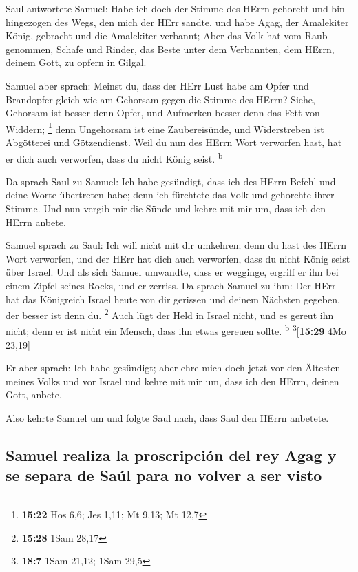  Saul antwortete Samuel: Habe ich doch der Stimme des
HErrn gehorcht und bin hingezogen des Wegs, den mich der HErr sandte,
und habe Agag, der Amalekiter König, gebracht und die Amalekiter
verbannt;  Aber das Volk hat vom Raub genommen, Schafe
und Rinder, das Beste unter dem Verbannten, dem HErrn, deinem Gott, zu
opfern in Gilgal.

 Samuel aber sprach: Meinst du, dass der HErr Lust habe
am Opfer und Brandopfer gleich wie am Gehorsam gegen die Stimme des
HErrn? Siehe, Gehorsam ist besser denn Opfer, und Aufmerken besser denn
das Fett von Widdern; \footnote{\textbf{15:22} Hos 6,6; Jes 1,11; Mt
  9,13; Mt 12,7}  denn Ungehorsam ist eine Zaubereisünde,
und Widerstreben ist Abgötterei und Götzendienst. Weil du nun des HErrn
Wort verworfen hast, hat er dich auch verworfen, dass du nicht König
seist. \textsuperscript{b}

 Da sprach Saul zu Samuel: Ich habe gesündigt, dass ich
des HErrn Befehl und deine Worte übertreten habe; denn ich fürchtete das
Volk und gehorchte ihrer Stimme.  Und nun vergib mir die
Sünde und kehre mit mir um, dass ich den HErrn anbete.

 Samuel sprach zu Saul: Ich will nicht mit dir umkehren;
denn du hast des HErrn Wort verworfen, und der HErr hat dich auch
verworfen, dass du nicht König seist über Israel.  Und
als sich Samuel umwandte, dass er wegginge, ergriff er ihn bei einem
Zipfel seines Rocks, und er zerriss.  Da sprach Samuel zu
ihm: Der HErr hat das Königreich Israel heute von dir gerissen und
deinem Nächsten gegeben, der besser ist denn du. \footnote{\textbf{15:28}
  1Sam 28,17}  Auch lügt der Held in Israel nicht, und es
gereut ihn nicht; denn er ist nicht ein Mensch, dass ihn etwas gereuen
sollte. \textsuperscript{b} \footnote{\textbf{18:7} 1Sam 21,12; 1Sam
  29,5}{[}\textbf{15:29} 4Mo 23,19{]}

 Er aber sprach: Ich habe gesündigt; aber ehre mich doch
jetzt vor den Ältesten meines Volks und vor Israel und kehre mit mir um,
dass ich den HErrn, deinen Gott, anbete.

 Also kehrte Samuel um und folgte Saul nach, dass Saul
den HErrn anbetete.

\hypertarget{samuel-realiza-la-proscripciuxf3n-del-rey-agag-y-se-separa-de-sauxfal-para-no-volver-a-ser-visto}{%
\subsection{Samuel realiza la proscripción del rey Agag y se separa de
Saúl para no volver a ser
visto}\label{samuel-realiza-la-proscripciuxf3n-del-rey-agag-y-se-separa-de-sauxfal-para-no-volver-a-ser-visto}}

